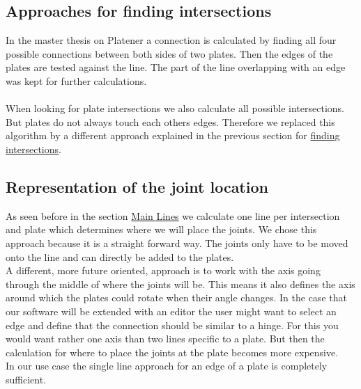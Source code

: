 \documentclass[../ClassicThesis.tex]{subfiles}
\begin{document}
\subsection{Approaches for finding intersections}
In the master thesis on Platener\cite{master-thesis} a connection is calculated by finding all four possible connections between both sides of two plates. Then the edges of the plates are tested against the line. The part of the line overlapping with an edge was kept for further calculations.\\
\*\\
When looking for plate intersections we also calculate all possible intersections. But plates do not always touch each others edges. Therefore we replaced this algorithm by a different approach explained in the previous section for \hyperref[findIntersections]{finding intersections}.

\subsection{Representation of the joint location}
As seen before in the section \hyperref[mainLine]{Main Lines} we calculate one line per intersection and plate which determines where we will place the joints. We chose this approach because it is a straight forward way. The joints only have to be moved onto the line and can directly be added to the plates. \\
A different, more future oriented, approach is to work with the axis going through the middle of where the joints will be. This means it also defines the axis around which the plates could rotate when their angle changes. 
In the case that our software will be extended with an editor the user might want to select an edge and define that the connection should be similar to a hinge. For this you would want rather one axis than two lines specific to a plate. But then the calculation for where to place the joints at the plate becomes more expensive.\\
In our use case the single line approach for an edge of a plate is completely sufficient.
\end{document}
